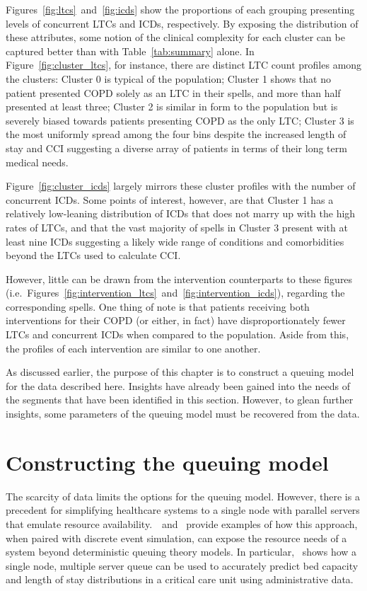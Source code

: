 Figures~\ref{fig:ltcs}~and~\ref{fig:icds} show the proportions of each grouping
presenting levels of concurrent LTCs and ICDs, respectively. By exposing the
distribution of these attributes, some notion of the clinical complexity for
each cluster can be captured better than with Table~\ref{tab:summary} alone. In
Figure~\ref{fig:cluster_ltcs}, for instance, there are distinct LTC count
profiles among the clusters: Cluster 0 is typical of the population; Cluster 1
shows that no patient presented COPD solely as an LTC in their spells, and more
than half presented at least three; Cluster 2 is similar in form to the
population but is severely biased towards patients presenting COPD as the only
LTC; Cluster 3 is the most uniformly spread among the four bins despite the
increased length of stay and CCI suggesting a diverse array of patients in
terms of their long term medical needs.

Figure~\ref{fig:cluster_icds} largely mirrors these cluster profiles with the
number of concurrent ICDs. Some points of interest, however, are that Cluster 1
has a relatively low-leaning distribution of ICDs that does not marry up with
the high rates of LTCs, and that the vast majority of spells in Cluster 3
present with at least nine ICDs suggesting a likely wide range of conditions and
comorbidities beyond the LTCs used to calculate CCI.\

However, little can be drawn from the intervention counterparts to these figures
(i.e.\ Figures~\ref{fig:intervention_ltcs}~and~\ref{fig:intervention_icds}),
regarding the corresponding spells. One thing of note is that patients receiving
both interventions for their COPD (or either, in fact) have disproportionately
fewer LTCs and concurrent ICDs when compared to the population. Aside from this,
the profiles of each intervention are similar to one another.

As discussed earlier, the purpose of this chapter is to construct a queuing model
for the data described here. Insights have already been gained into the needs of
the segments that have been identified in this section. However, to glean
further insights, some parameters of the queuing model must be recovered from
the data.

\section{Constructing the queuing model}\label{sec:model}

The scarcity of data limits the options for the queuing model. However, there is
a precedent for simplifying healthcare systems to a single node with parallel
servers that emulate resource
availability.~\cite{Steins2013}~and~\cite{Williams2015} provide examples of
how this approach, when paired with discrete event simulation, can expose the
resource needs of a system beyond deterministic queuing theory models. In
particular,~\cite{Williams2015} shows how a single node, multiple server queue
can be used to accurately predict bed capacity and length of stay distributions
in a critical care unit using administrative data.

